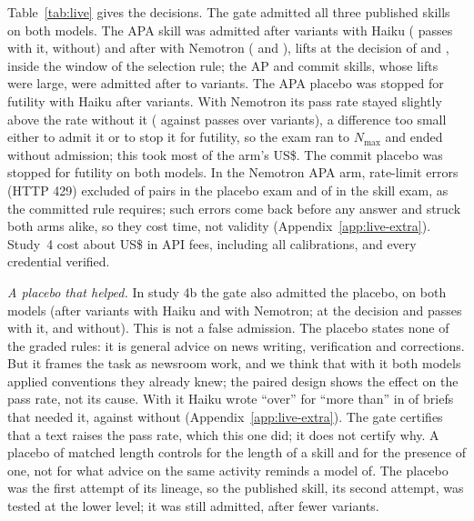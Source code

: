 Table~\ref{tab:live} gives the decisions. The gate admitted all three published skills on both models. The APA skill was admitted after \NLsFourRealN{} variants with Haiku (\NLsFourRealTauWith{} passes with it, \NLsFourRealTauWithout{} without) and after \NLnFourRealN{} with Nemotron (\NLnFourRealTauWith{} and \NLnFourRealTauWithout), lifts at the decision of \NLsFourRealLiftTau{} and \NLnFourRealLiftTau, inside the window of the selection rule; the AP and commit skills, whose lifts were large, were admitted after \NLFourBCMinN{} to \NLFourBCMaxN{} variants. The APA placebo was stopped for futility with Haiku after \NLsFourPlacN{} variants. With Nemotron its pass rate stayed slightly above the rate without it (\NLnFourPlacTauWith{} against \NLnFourPlacTauWithout{} passes over \NLnFourPlacN{} variants), a difference too small either to admit it or to stop it for futility, so the exam ran to $N_{\max}$ and ended without admission; this took most of the arm's US\$\NLnFourCost. The commit placebo was stopped for futility on both models. In the Nemotron APA arm, rate-limit errors (HTTP 429) excluded \NLnFourPlacExcl{} of \NLnFourPlacRun{} pairs in the placebo exam and \NLnFourRealExcl{} of \NLnFourRealRun{} in the skill exam, as the committed rule requires; such errors come back before any answer and struck both arms alike, so they cost time, not validity (Appendix~\ref{app:live-extra}). Study~4 cost about US\$\NLFourTotalCost{} in API fees, including all calibrations, and every credential verified.

\emph{A placebo that helped.} In study 4b the gate also admitted the placebo, on both models (after \NLsFourBPlacN{} variants with Haiku and \NLnFourBPlacN{} with Nemotron; at the decision \NLsFourBPlacTauWith{} and \NLnFourBPlacTauWith{} passes with it, \NLsFourBPlacTauWithout{} and \NLnFourBPlacTauWithout{} without). This is not a false admission. The placebo states none of the graded rules: it is general advice on news writing, verification and corrections. But it frames the task as newsroom work, and we think that with it both models applied conventions they already knew; the paired design shows the effect on the pass rate, not its cause. With it Haiku wrote ``over'' for ``more than'' in \NLsFourBPlacOverWith{} of \NLsFourBPlacOverN{} briefs that needed it, against \NLsFourBPlacOverWithout{} without (Appendix~\ref{app:live-extra}). The gate certifies that a text raises the pass rate, which this one did; it does not certify why. A placebo of matched length controls for the length of a skill and for the presence of one, not for what advice on the same activity reminds a model of. The placebo was the first attempt of its lineage, so the published skill, its second attempt, was tested at the lower level; it was still admitted, after fewer variants.

